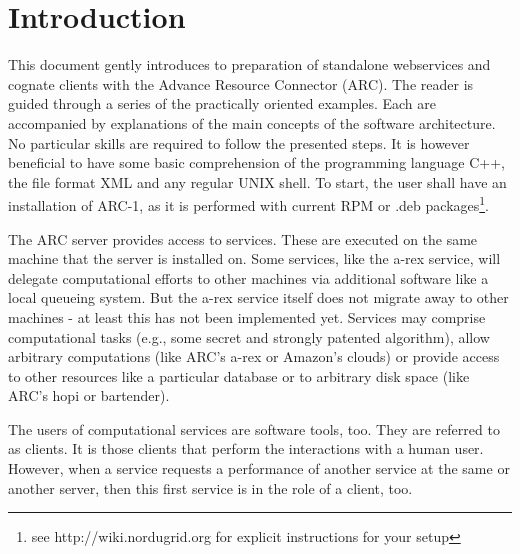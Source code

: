 
\chapter{Introduction}

This document gently introduces to preparation of standalone webservices and cognate clients with the Advance Resource Connector (ARC).
The reader is guided through a series of the practically oriented examples.
Each are accompanied by explanations of the main concepts of the software architecture.
No particular skills are required to follow the presented steps.
It is however beneficial to have some basic comprehension of the programming language C++, the file format XML and any regular UNIX shell.
To start, the user shall have an installation of ARC-1, as it is performed with current RPM or .deb packages\footnote{see http://wiki.nordugrid.org for explicit instructions for your setup}.


The ARC server provides access to services.
These are executed on the same machine that the server is installed on.
Some services, like the a-rex service, will delegate computational efforts to other machines
via additional software like a local queueing system.
But the a-rex service itself does not migrate away to other machines - at least this
has not been implemented yet.
Services may comprise computational tasks (e.g., some secret and strongly
patented algorithm), allow arbitrary computations (like ARC's a-rex or
Amazon's clouds) or provide access to other resources like a particular
database or to arbitrary disk space (like ARC's hopi or bartender).


The users of computational services are software tools, too.
They are referred to as clients.
It is those clients that perform the interactions with a human user.
However, when a service requests a performance of another service at the same or another server, then this first service is in the role of a client, too.


